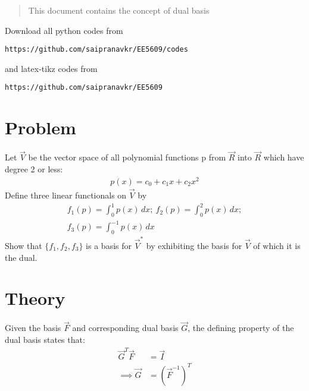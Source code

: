 \documentclass[journal,12pt,twocolumn]{IEEEtran}
\begin{document}
%
\vspace{2ex}
\begin{center}
\end{center}
\begin{abstract}
This document contains the concept of dual basis
\end{abstract}
Download all python codes from 
%
\begin{lstlisting}
https://github.com/saipranavkr/EE5609/codes
\end{lstlisting}
%
and latex-tikz codes from 
%
\begin{lstlisting}
https://github.com/saipranavkr/EE5609
\end{lstlisting}
%
\section{Problem}
Let $\vec{V}$ be the vector space of all polynomial functions p from $\vec{R}$ into $\vec{R}$ which have degree 2 or less:
\begin{align}
    p(x) = c_0 + c_1x + c_2x^2 \nonumber
\end{align}
Define three linear functionals on $\vec{V}$ by
\begin{align}
    f_1(p) = \int_{0}^{1} p(x) \, dx; \: f_2(p) = \int_{0}^{2} p(x) \, dx; \nonumber \\
    f_3(p) = \int_{0}^{-1} p(x) \, dx \nonumber
\end{align}
Show that $\{f_1, f_2,f_3\}$ is a basis for $\vec{V}^*$ by exhibiting the basis for $\vec{V}$ of which it is the dual. 
%
%
\section{Theory}
Given the basis $\vec{F}$ and corresponding dual basis $\vec{G}$, the defining property of the dual basis states that:
\begin{align}
    \vec{G}^T \vec{F} &= \vec{I} \nonumber \\
    \implies \vec{G} &= (\vec{F}^{-1})^T \label{eq:2_1}
\end{align}
\end{document}
